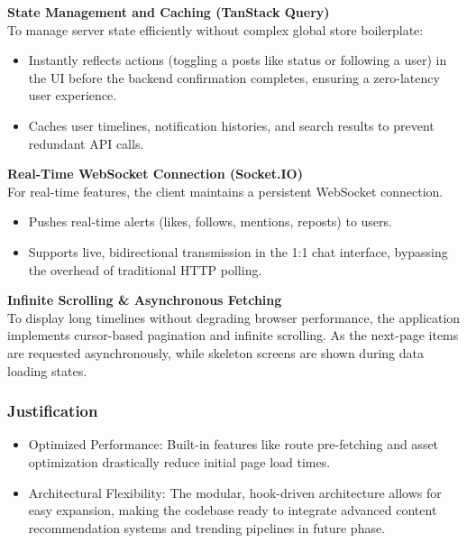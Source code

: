 \medskip\noindent\textbf{State Management and Caching (TanStack Query)}\\[2pt]

To manage server state efficiently without complex global store boilerplate:
\begin{itemize}
  \item Instantly reflects actions (toggling a posts like status or following a user) in the UI before the backend confirmation completes, ensuring a zero-latency user experience.
  \item Caches user timelines, notification histories, and search results to prevent redundant API calls.
\end{itemize}

\medskip\noindent\textbf{Real-Time WebSocket Connection (Socket.IO)}\\[2pt]

For real-time features, the client maintains a persistent WebSocket connection.
\begin{itemize}
  \item Pushes real-time alerts (likes, follows, mentions, reposts) to users.
  \item Supports live, bidirectional transmission in the 1:1 chat interface, bypassing the overhead of traditional HTTP polling.
\end{itemize}

\medskip\noindent\textbf{Infinite Scrolling \& Asynchronous Fetching}\\[2pt]

To display long timelines without degrading browser performance, the application implements cursor-based pagination and infinite scrolling. As the next-page items are requested asynchronously, while skeleton screens are shown during data loading states.

\subsubsection{Justification}
\begin{itemize}
  \item Optimized Performance: Built-in features like route pre-fetching and asset optimization drastically reduce initial page load times.
  \item Architectural Flexibility: The modular, hook-driven architecture allows for easy expansion, making the codebase ready to integrate advanced content recommendation systems and trending pipelines in future phase.
\end{itemize}

